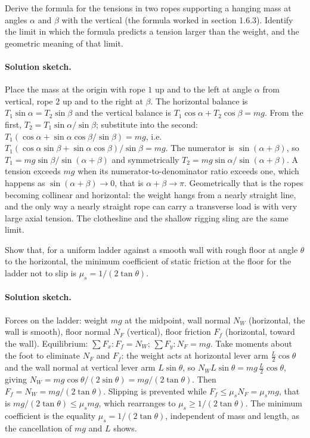 \begin{exercise}
Derive the formula for the tensions in two ropes supporting a hanging
mass at angles $\alpha$ and $\beta$ with the vertical (the formula
worked in section 1.6.3). Identify the limit in which the formula
predicts a tension larger than the weight, and the geometric meaning
of that limit.
\paragraph{Solution sketch.} Place the mass at the origin with rope $1$
up and to the left at angle $\alpha$ from vertical, rope $2$ up and to
the right at $\beta$. The horizontal balance is $T_1\sin\alpha =
T_2\sin\beta$ and the vertical balance is $T_1\cos\alpha + T_2\cos\beta
= mg$. From the first, $T_2 = T_1\sin\alpha/\sin\beta$; substitute into
the second: $T_1(\cos\alpha + \sin\alpha\cos\beta/\sin\beta) = mg$, i.e.
$T_1(\cos\alpha\sin\beta + \sin\alpha\cos\beta)/\sin\beta = mg$. The
numerator is $\sin(\alpha+\beta)$, so $T_1 = mg\sin\beta/\sin(\alpha+
\beta)$ and symmetrically $T_2 = mg\sin\alpha/\sin(\alpha+\beta)$. A
tension exceeds $mg$ when its numerator-to-denominator ratio exceeds one,
which happens as $\sin(\alpha+\beta) \to 0$, that is $\alpha + \beta \to
\pi$. Geometrically that is the ropes becoming collinear and horizontal:
the weight hangs from a nearly straight line, and the only way a nearly
straight rope can carry a transverse load is with very large axial
tension. The clothesline and the shallow rigging sling are the same
limit.
\end{exercise}

\begin{exercise}
Show that, for a uniform ladder against a smooth wall with rough
floor at angle $\theta$ to the horizontal, the minimum coefficient of
static friction at the floor for the ladder not to slip is $\mu_s =
1/(2 \tan\theta)$.
\paragraph{Solution sketch.} Forces on the ladder: weight $mg$ at the
midpoint, wall normal $N_W$ (horizontal, the wall is smooth), floor
normal $N_F$ (vertical), floor friction $F_f$ (horizontal, toward the
wall). Equilibrium: $\sum F_x: F_f = N_W$; $\sum F_y: N_F = mg$. Take
moments about the foot to eliminate $N_F$ and $F_f$: the weight acts at
horizontal lever arm $\tfrac{L}{2}\cos\theta$ and the wall normal at
vertical lever arm $L\sin\theta$, so $N_W L\sin\theta = mg\,\tfrac{L}{2}
\cos\theta$, giving $N_W = mg\cos\theta/(2\sin\theta) = mg/(2\tan\theta)$.
Then $F_f = N_W = mg/(2\tan\theta)$. Slipping is prevented while $F_f
\le \mu_s N_F = \mu_s mg$, that is $mg/(2\tan\theta) \le \mu_s mg$, which
rearranges to $\mu_s \ge 1/(2\tan\theta)$. The minimum coefficient is
the equality $\mu_s = 1/(2\tan\theta)$, independent of mass and length,
as the cancellation of $mg$ and $L$ shows.
\end{exercise}

